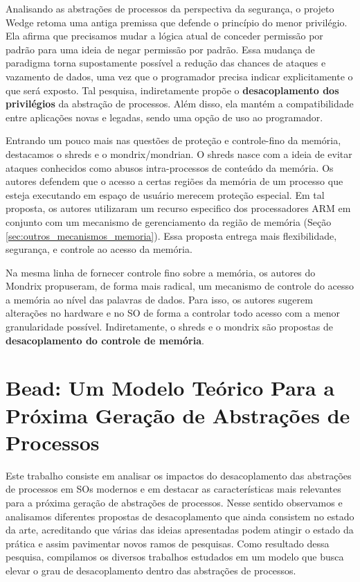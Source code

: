 Analisando as abstrações de processos da perspectiva da segurança, o projeto
Wedge retoma uma antiga premissa que defende o princípio do menor privilégio.
Ela afirma que precisamos mudar a lógica atual de conceder permissão por
padrão para uma ideia de negar permissão por padrão. Essa mudança de paradigma
torna supostamente possível a redução das chances de ataques e vazamento de
dados, uma vez que o programador precisa indicar explicitamente o que será
exposto. Tal pesquisa, indiretamente propõe o \textbf{desacoplamento dos
privilégios} da abstração de processos. Além disso, ela mantém a
compatibilidade entre aplicações novas e legadas, sendo uma opção de uso ao programador.

Entrando um pouco mais nas questões de proteção e controle-fino da memória,
destacamos o shreds e o mondrix/mondrian. O shreds nasce com a ideia de evitar
ataques conhecidos como abusos intra-processos de conteúdo da memória. Os
autores defendem que o acesso a certas regiões da memória de um processo
que esteja executando em espaço de usuário merecem proteção especial. Em tal proposta, os
autores utilizaram um recurso especifico dos processadores ARM em conjunto com
um mecanismo de gerenciamento da região de memória (Seção
\ref{sec:outros_mecanismos_memoria}). Essa proposta entrega mais flexibilidade,
segurança, e controle ao acesso da memória.

Na mesma linha de fornecer controle fino sobre a memória, os autores do Mondrix
propuseram, de forma mais radical, um mecanismo de controle do acesso a memória
ao nível das palavras de dados. Para isso, os autores sugerem alterações no
hardware e no SO de forma a controlar todo acesso com a menor granularidade
possível. Indiretamente, o shreds e o mondrix são propostas de
\textbf{desacoplamento do controle de memória}.

\section{Bead: Um Modelo Teórico Para a Próxima Geração de Abstrações de Processos}

Este trabalho consiste em analisar os impactos do desacoplamento das abstrações
de processos em SOs modernos e em destacar as características mais relevantes
para a próxima geração de abstrações de processos. Nesse sentido observamos e
analisamos diferentes propostas de desacoplamento que ainda consistem no estado
da arte, acreditando que várias das ideias apresentadas podem atingir o estado
da prática e assim pavimentar novos ramos de pesquisas. Como resultado dessa
pesquisa, compilamos os diversos trabalhos estudados em um modelo que busca
elevar o grau de desacoplamento dentro das abstrações de processos.

